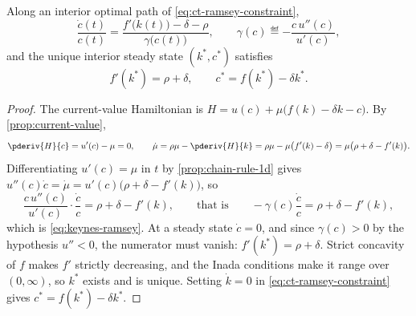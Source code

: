 \begin{theorem}\label{thm:keynes-ramsey}
	Along an interior optimal path of \eqref{eq:ct-ramsey-constraint},
	\begin{equation}\label{eq:keynes-ramsey}
		\frac{\dot c(t)}{c(t)}
		=\frac{f'\bigl(k(t)\bigr)-\delta-\rho}{\gamma\bigl(c(t)\bigr)},
		\qquad
		\gamma(c)\eqdef-\frac{c\,u''(c)}{u'(c)},
	\end{equation}
	and the unique interior steady state $(k^{\ast},c^{\ast})$ satisfies
	\begin{equation}\label{eq:modified-golden-rule}
		f'(k^{\ast})=\rho+\delta,
		\qquad
		c^{\ast}=f(k^{\ast})-\delta k^{\ast}.
	\end{equation}
\end{theorem}

\begin{proof}
	The current-value Hamiltonian is
	$H=u(c)+\mu\bigl(f(k)-\delta k-c\bigr)$. By
	\autoref{prop:current-value},
	\begin{equation}\label{eq:ct-ramsey-foc}
		\pderiv{H}{c}=u'(c)-\mu=0,
		\qquad
		\dot\mu=\rho\mu-\pderiv{H}{k}=\rho\mu-\mu\bigl(f'(k)-\delta\bigr)
		=\mu\bigl(\rho+\delta-f'(k)\bigr).
	\end{equation}
	Differentiating $u'(c)=\mu$ in $t$ by \autoref{prop:chain-rule-1d} gives
	$u''(c)\dot c=\dot\mu=u'(c)\bigl(\rho+\delta-f'(k)\bigr)$, so
	\[
		\frac{c\,u''(c)}{u'(c)}\cdot\frac{\dot c}{c}=\rho+\delta-f'(k),
		\qquad\text{that is}\qquad
		-\gamma(c)\frac{\dot c}{c}=\rho+\delta-f'(k),
	\]
	which is \eqref{eq:keynes-ramsey}. At a steady state $\dot c=0$, and since
	$\gamma(c)>0$ by the hypothesis $u''<0$, the numerator must vanish:
	$f'(k^{\ast})=\rho+\delta$. Strict concavity of $f$ makes $f'$ strictly
	decreasing, and the Inada conditions make it range over $(0,\infty)$, so
	$k^{\ast}$ exists and is unique. Setting $\dot k=0$ in
	\eqref{eq:ct-ramsey-constraint} gives $c^{\ast}=f(k^{\ast})-\delta k^{\ast}$.
\end{proof}

